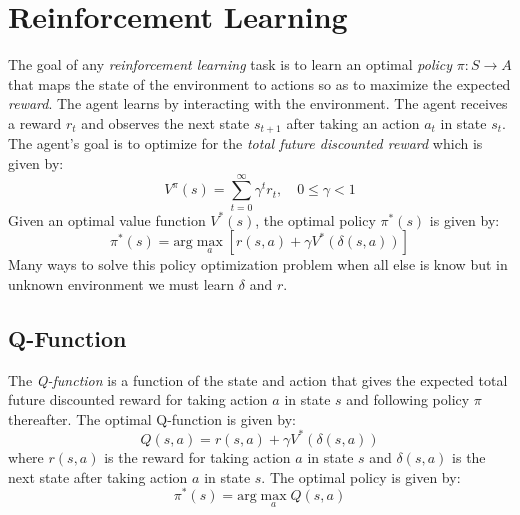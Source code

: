 \section{Reinforcement Learning}
The goal of any \emph{reinforcement learning} task is to learn an optimal \emph{policy} \(\pi : S \to A\) that maps the state of the environment to actions so as to maximize the expected \emph{reward}. The agent learns by interacting with the environment. The agent receives a reward $r_t$ and observes the next state $s_{t+1}$ after taking an action $a_t$ in state $s_t$. The agent's goal is to optimize for the \emph{total future discounted reward} which is given by:
\[
    V^\pi(s) = \sum_{t=0}^\infty \gamma^t r_t,\quad 0\leq \gamma < 1
\]
Given an optimal value function $V^*(s)$, the optimal policy $\pi^*(s)$ is given by:
\[
    \pi^*(s) = \text{arg}\max_a \left[r(s,a) + \gamma V^*\left(\delta(s,a)\right)\right]
\]
Many ways to solve this policy optimization problem when all else is know but in unknown environment we must learn \(\delta\) and \(r\).\\
\subsection{Q-Function}
The \emph{Q-function} is a function of the state and action that gives the expected total future discounted reward for taking action $a$ in state $s$ and following policy $\pi$ thereafter. The optimal Q-function is given by:
\[
    Q(s,a) = r(s,a) + \gamma V^*\left(\delta(s,a)\right)
\]
where $r(s,a)$ is the reward for taking action $a$ in state $s$ and $\delta(s,a)$ is the next state after taking action $a$ in state $s$. The optimal policy is given by:
\[
    \pi^*(s) = \text{arg}\max_a Q(s,a)
\]
